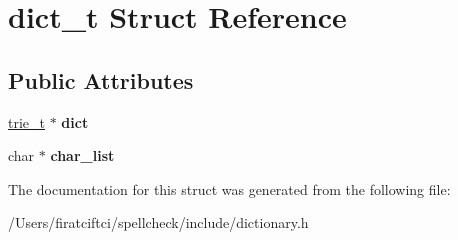 \hypertarget{structdict__t}{}\section{dict\+\_\+t Struct Reference}
\label{structdict__t}
\subsection*{Public Attributes}
\begin{DoxyCompactItemize}
\item 
\mbox{\label{structdict__t_a4743f4cde2360543d7976d68e0bfacee}} 
\mbox{\hyperlink{structtrie__t}{trie\+\_\+t}} $\ast$ {\bfseries dict}
\item 
\mbox{\label{structdict__t_a7bceea2e14139c9899276927ea4736c6}} 
char $\ast$ {\bfseries char\+\_\+list}
\end{DoxyCompactItemize}


The documentation for this struct was generated from the following file\+:\begin{DoxyCompactItemize}
\item 
/\+Users/firatciftci/spellcheck/include/dictionary.\+h\end{DoxyCompactItemize}
